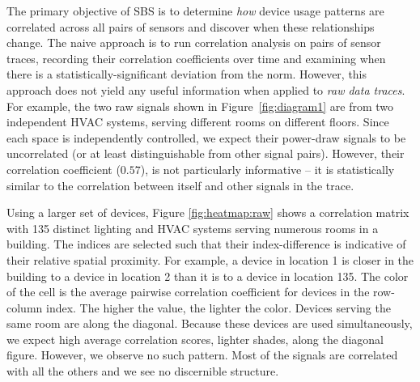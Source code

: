 The primary objective of SBS is to determine \emph{how} device usage patterns are correlated across all pairs of sensors and 
discover when these relationships change.  
The naive approach is to run correlation analysis on pairs of sensor traces, recording their correlation coefficients over time and 
examining when there is a statistically-significant deviation from the norm.  
However, this approach does not yield any useful information when applied to \emph{raw data traces}.
For example, the two raw signals shown in Figure~\ref{fig:diagram1} are from two independent HVAC systems,
 serving different rooms on different floors.
Since each space is independently controlled, we expect their power-draw signals to be uncorrelated (or at least distinguishable 
from other signal pairs).  However, their correlation coefficient ($0.57$), is not particularly informative -- it is statistically
similar to the correlation between itself and other signals in the trace.  

Using a larger set of devices, Figure \ref{fig:heatmap:raw} shows a correlation matrix with 135 distinct lighting and HVAC systems serving numerous rooms in a building.  %
The indices are selected such that their index-difference is indicative of their relative spatial proximity.  
For example, a device in location 1 is closer in the building to a device in location 2 than it is to 
a device in location 135. 
The color of the cell is the average pairwise correlation coefficient for devices in the row-column index.  The higher the value, the lighter the color.
Devices serving the same room are along the diagonal.  Because these devices are used simultaneously, we expect
high average correlation scores, lighter shades, along the diagonal figure.
However, we observe no such pattern.  %
Most of the signals are correlated with all the others and we see no discernible structure.

